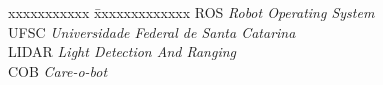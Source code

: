 \ifx\isenglish\undefined
{}
\else
{}
\fi


\begin{tabbing}
xxxxxxxxxxx \= xxxxxxxxxxxxx \kill
\textsc{ROS}            \> \textit{Robot Operating System}\\
\textsc{UFSC} \> \textit{Universidade Federal de Santa Catarina}\\
\textsc{LIDAR}            \> \textit{Light Detection And Ranging}\\
\textsc{COB}            \> \textit{Care-o-bot}\\
\end{tabbing}

